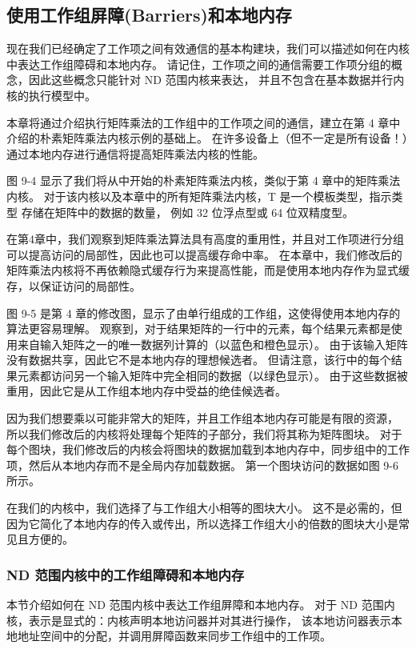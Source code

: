 \subsection{使用工作组屏障(Barriers)和本地内存}
现在我们已经确定了工作项之间有效通信的基本构建块，我们可以描述如何在内核中表达工作组障碍和本地内存。 
请记住，工作项之间的通信需要工作项分组的概念，因此这些概念只能针对 ND 范围内核来表达，
并且不包含在基本数据并行内核的执行模型中。

本章将通过介绍执行矩阵乘法的工作组中的工作项之间的通信，建立在第 4 章中介绍的朴素矩阵乘法内核示例的基础上。 
在许多设备上（但不一定是所有设备！）通过本地内存进行通信将提高矩阵乘法内核的性能。

图 9-4 显示了我们将从中开始的朴素矩阵乘法内核，类似于第 4 章中的矩阵乘法内核。
对于该内核以及本章中的所有矩阵乘法内核，T 是一个模板类型，指示类型 存储在矩阵中的数据的数量，
例如 32 位浮点型或 64 位双精度型。

在第4章中，我们观察到矩阵乘法算法具有高度的重用性，并且对工作项进行分组可以提高访问的局部性，因此也可以提高缓存命中率。 
在本章中，我们修改后的矩阵乘法内核将不再依赖隐式缓存行为来提高性能，而是使用本地内存作为显式缓存，以保证访问的局部性。

图 9-5 是第 4 章的修改图，显示了由单行组成的工作组，这使得使用本地内存的算法更容易理解。 
观察到，对于结果矩阵的一行中的元素，每个结果元素都是使用来自输入矩阵之一的唯一数据列计算的（以蓝色和橙色显示）。 
由于该输入矩阵没有数据共享，因此它不是本地内存的理想候选者。 
但请注意，该行中的每个结果元素都访问另一个输入矩阵中完全相同的数据（以绿色显示）。 
由于这些数据被重用，因此它是从工作组本地内存中受益的绝佳候选者。

因为我们想要乘以可能非常大的矩阵，并且工作组本地内存可能是有限的资源，
所以我们修改后的内核将处理每个矩阵的子部分，我们将其称为矩阵图块。 
对于每个图块，我们修改后的内核会将图块的数据加载到本地内存中，同步组中的工作项，然后从本地内存而不是全局内存加载数据。 
第一个图块访问的数据如图 9-6 所示。

在我们的内核中，我们选择了与工作组大小相等的图块大小。 
这不是必需的，但因为它简化了本地内存的传入或传出，所以选择工作组大小的倍数的图块大小是常见且方便的。

\subsubsection{ND 范围内核中的工作组障碍和本地内存}
本节介绍如何在 ND 范围内核中表达工作组屏障和本地内存。 
对于 ND 范围内核，表示是显式的：内核声明本地访问器并对其进行操作，
该本地访问器表示本地地址空间中的分配，并调用屏障函数来同步工作组中的工作项。

